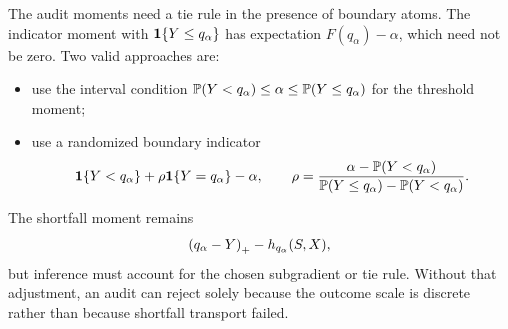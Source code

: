 The audit moments need a tie rule in the presence of boundary atoms. The
indicator moment with $\mathbf{1}\{Y\le q_\alpha\}$ has expectation
$F(q_\alpha)-\alpha$, which need not be zero. Two valid approaches are:
\begin{itemize}[leftmargin=*,nosep]
\item use the interval condition
$\mathbb{P}(Y<q_\alpha)\le\alpha\le\mathbb{P}(Y\le q_\alpha)$ for the threshold moment;
\item use a randomized boundary indicator
\[
\mathbf{1}\{Y<q_\alpha\}+\rho\mathbf{1}\{Y=q_\alpha\}-\alpha,
\qquad
\rho=\frac{\alpha-\mathbb{P}(Y<q_\alpha)}
{\mathbb{P}(Y\le q_\alpha)-\mathbb{P}(Y<q_\alpha)}.
\]
\end{itemize}
The shortfall moment remains
\[
\left(q_\alpha-Y\right)_{+}-h_{q_\alpha}(S,X),
\]
but inference must account for the chosen subgradient or tie rule. Without
that adjustment, an audit can reject solely because the outcome scale is
discrete rather than because shortfall transport failed.
